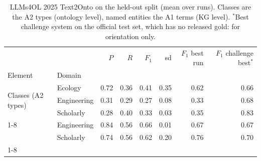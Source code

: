 \begin{table}
\caption{LLMs4OL 2025 Text2Onto on the held-out split (mean over runs). Classes are the A2 types (ontology level), named entities the A1 terms (KG level). $^*$Best challenge system on the official test set, which has no released gold: for orientation only.}
\label{tab:onto_llms4ol}
\begin{tabular}{llrrrrrr}
\toprule
 &  & $P$ & $R$ & $F_1$ & sd & $F_1$ best run & $F_1$ challenge best$^*$ \\
Element & Domain &  &  &  &  &  &  \\
\midrule
\multirow[t]{3}{*}{Classes (A2 types)} & Ecology & 0.72 & 0.36 & 0.41 & 0.35 & 0.62 & 0.66 \\
 & Engineering & 0.31 & 0.29 & 0.27 & 0.08 & 0.33 & 0.68 \\
 & Scholarly & 0.28 & 0.40 & 0.33 & 0.03 & 0.35 & 0.83 \\
\cline{1-8}
\multirow[t]{2}{*}{Named entities (A1 terms)} & Engineering & 0.84 & 0.56 & 0.66 & 0.01 & 0.67 & 0.67 \\
 & Scholarly & 0.74 & 0.56 & 0.62 & 0.20 & 0.76 & 0.70 \\
\cline{1-8}
\bottomrule
\end{tabular}
\end{table}
